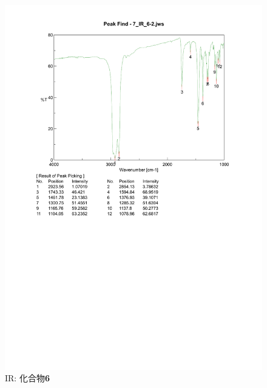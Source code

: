 \documentclass{ltjsarticle}
\theoremstyle{definition}
\numberwithin{equation}{section}
\begin{document}
\begin{figure}[htbp]
\begin{center}
\includegraphics[width = 15 cm]{IR_6-2-2.pdf}
\caption{IR: 化合物\textbf{6}}
\label{IR_6-2-2}
\end{center}
\end{figure}

\newpage
\end{document}

